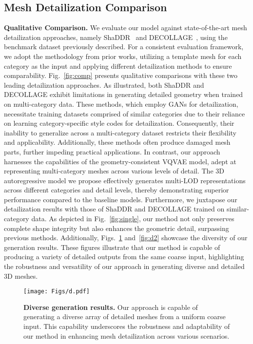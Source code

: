 \subsection{Mesh Detailization Comparison}
\noindent\textbf{Qualitative Comparison.}
We evaluate our model against state-of-the-art mesh detailization approaches, namely ShaDDR~\cite{shaddr} and DECOLLAGE~\cite{DECOLLAGE}, using the benchmark dataset previously described. For a consistent evaluation framework, we adopt the methodology from prior works\cite{shaddr,DECOLLAGE}, utilizing a template mesh for each category as the input and applying different detailization methods to ensure comparability. Fig.~\ref{fig:comp} presents qualitative comparisons with these two leading detailization approaches. As illustrated, both ShaDDR and DECOLLAGE exhibit limitations in generating detailed geometry when trained on multi-category data. These methods, which employ GANs for detailization, necessitate training datasets comprised of similar categories due to their reliance on learning category-specific style codes for detailization. Consequently, their inability to generalize across a multi-category dataset restricts their flexibility and applicability. Additionally, these methods often produce damaged mesh parts, further impeding practical applications. In contrast, our approach harnesses the capabilities of the geometry-consistent VQVAE model, adept at representing multi-category meshes across various levels of detail. The 3D autoregressive model we propose effectively generates multi-LOD representations across different categories and detail levels, thereby demonstrating superior performance compared to the baseline models. Furthermore, we juxtapose our detailization results with those of ShaDDR and DECOLLAGE trained on similar-category data. As depicted in Fig.~\ref{fig:single}, our method not only preserves complete shape integrity but also enhances the geometric detail, surpassing previous methods. Additionally, Figs.~\ref{fig:d} and~\ref{fig:d2} showcase the diversity of our generation results. These figures illustrate that our method is capable of producing a variety of detailed outputs from the same coarse input, highlighting the robustness and versatility of our approach in generating diverse and detailed 3D meshes.
\begin{figure}
    \centering
    \texttt{[image: Figs/d.pdf]}
    \caption{\textbf{Diverse generation results.} Our approach is capable of generating a diverse array of detailed meshes from a uniform coarse input. This capability underscores the robustness and adaptability of our method in enhancing mesh detailization across various scenarios.}
    \label{fig:d}
\end{figure}

